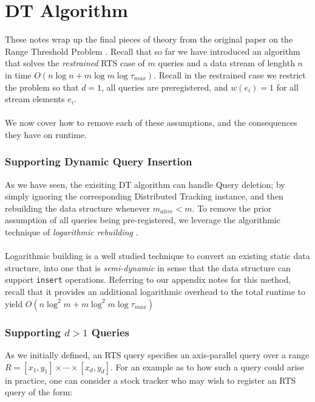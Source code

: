 \documentclass{article}
\begin{document}
\hspace{95mm}

\section*{DT Algorithm}
These notes wrap up the final pieces of theory from the original paper on the Range Threshold Problem \cite{Gan2016}. Recall that so far we have introduced an algorithm that solves the \textit{restrained} RTS case of $m$ queries and a data stream of lenghth $n$ in time $O(n\log n + m\log m\log\tau_{max})$. Recall in the restrained case we restrict the problem so that $d=1$, all queries are preregistered, and $w(e_i) = 1$ for all stream elements $e_i$. \\
\\
We now cover how to remove each of these assumptions, and the consequences they have on runtime.


\subsubsection*{Supporting Dynamic Query Insertion}
As we have seen, the exisiting DT algorithm can handle Query deletion; by simply ignoring the corresponding Distributed Tracking instance, and then rebuilding the data structure whenever $m_{alive} < m$. To remove the prior assumption of all queries being pre-registered, we leverage the algorithmic technique of \textit{logarithmic rebuilding} \cite{BENTLEY1980301}. \\
\\
Logarithmic building is a well studied technique to convert an existing static data structure, into one that is \textit{semi-dynamic} in sense that the data structure can support \texttt{insert} operations. Referring to our appendix notes for this method, recall that it provides an additional logarithmic overhead to the total runtime to yield $O(n\log^2 m + m\log^2 m\log\tau_{max})$



\subsubsection*{Supporting $d>1$ Queries} 

As we initially defined, an RTS query specifies an axis-parallel query over a range $R = [x_1, y_1] \times \cdots \times [x_d, y_d]$. For an example as to how such a query could arise in practice, one can consider a stock tracker who may wish to register an RTS query of the form: 
\end{document}
